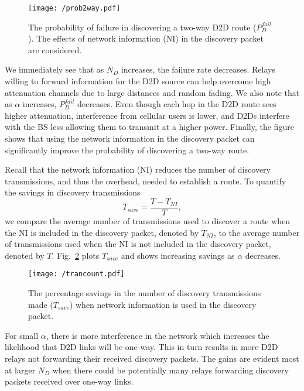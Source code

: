 \documentclass[10pt, final, journal, letterpaper,oneside, twocolumn]{IEEEtran}
\begin{document}
\begin{figure}[htp]
\center
  \texttt{[image: /prob2way.pdf]}
  \caption[]{The probability of failure in discovering a two-way D2D route ($P^{fail}_{D}$).  The effects of network information (NI) in the discovery packet are considered.  } 
  \label{fig:prob2way}
\end{figure}  
We immediately see that as $N_D$ increases, the failure rate decreases.  Relays willing to forward information for the D2D source can help overcome high attenuation channels due to large distances and random fading.  We also note that as $\alpha$ increases, $P^{fail}_{D}$ decreases.  Even though each hop in the D2D route sees higher attenuation, interference from cellular users is lower, and D2Ds interfere with the BS less allowing them to transmit at a higher power.  Finally, the figure shows that using the network information in the discovery packet can significantly improve the probability of discovering a two-way route.  

Recall that the network information (NI) reduces the number of discovery transmissions, and thus the overhead, needed to establish a route.  To quantify the savings in discovery transmissions 
\begin{equation}
T_{save} = \dfrac{T-T_{NI}}{T},
\end{equation} 
we compare the average number of transmissions used to discover a route when the NI is included in the discovery packet, denoted by $T_{NI}$, to the average number of transmissions used when the NI is not included in the discovery packet, denoted by $T$.  Fig.~\ref{fig:trancount} plots $T_{save}$ and shows increasing savings as $\alpha$ decreases.
\begin{figure}[htp]
\center
  \texttt{[image: /trancount.pdf]}
  \caption[]{The percentage savings in the number of discovery transmissions made ($T_{save}$) when network information is used in the discovery packet.} 
  \label{fig:trancount} 
\end{figure} 
For small $\alpha$, there is more interference in the network which increases the likelihood  that D2D links will be one-way.  This in turn results in more D2D relays not forwarding their received discovery packets.  The gains are evident most at larger $N_D$ when there could be potentially many relays forwarding discovery packets received over one-way links.  
\end{document}
